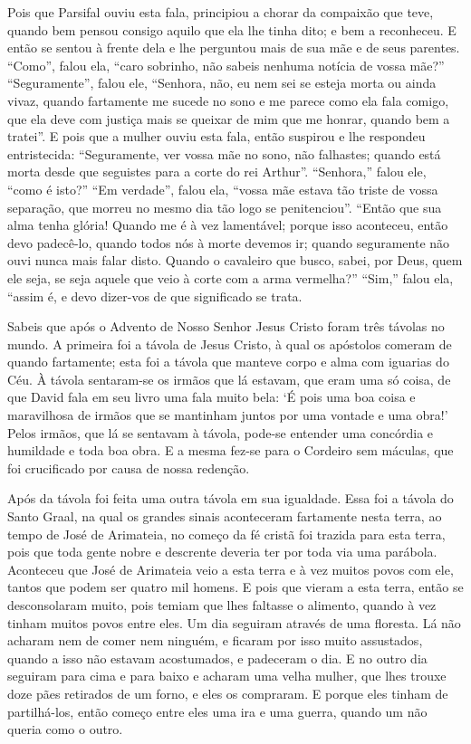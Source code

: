Pois que Parsifal ouviu esta fala, principiou a chorar da compaixão que
teve, quando bem pensou consigo aquilo que ela lhe tinha dito; e bem a
reconheceu. E então se sentou à frente dela e lhe perguntou mais de sua mãe e
de seus parentes. “Como”, falou ela, “caro sobrinho, não sabeis nenhuma notícia
de vossa mãe?” “Seguramente”, falou ele, “Senhora, não, eu nem sei se esteja
morta ou ainda vivaz, quando fartamente me sucede no sono e me parece como ela
fala comigo, que ela deve com justiça mais se queixar de mim que me honrar,
quando bem a tratei”. E pois que a mulher ouviu esta fala, então suspirou e lhe
respondeu entristecida: “Seguramente, ver vossa mãe no sono, não falhastes;
quando está morta desde que seguistes para a corte do rei Arthur”. “Senhora,”
falou ele, “como é isto?” “Em verdade”, falou ela, “vossa mãe estava tão
triste de vossa separação, que morreu no mesmo dia tão logo se penitenciou”.
“Então que sua alma tenha glória! Quando me é à vez lamentável; porque isso
aconteceu, então devo padecê-lo, quando todos nós à morte devemos ir; quando
seguramente não ouvi nunca mais falar disto. Quando o cavaleiro que busco,
sabei, por Deus, quem ele seja, se seja aquele que veio à corte com a arma
vermelha?” “Sim,” falou ela, “assim é, e devo dizer-vos de que significado se
trata.

Sabeis que após o Advento de Nosso Senhor Jesus Cristo foram três távolas no
mundo. A primeira foi a távola de Jesus Cristo, à qual os apóstolos comeram de
quando fartamente; esta foi a távola que manteve corpo e alma com iguarias do
Céu. À távola sentaram-se os irmãos que lá estavam, que eram uma só coisa, de
que David fala em seu livro uma fala muito bela: ‘É pois uma boa coisa e
maravilhosa de irmãos que se mantinham juntos por uma vontade e uma obra!’
Pelos irmãos, que lá se sentavam à távola, pode-se entender uma concórdia e
humildade e toda boa obra. E a mesma fez-se para o Cordeiro sem máculas, que
foi crucificado por causa de nossa redenção. 

Após da távola foi feita uma outra távola em sua igualdade. Essa foi a
távola do Santo Graal, na qual os grandes sinais aconteceram fartamente nesta
terra, ao tempo de José de Arimateia, no começo da fé cristã foi trazida para
esta terra, pois que toda gente nobre e descrente deveria ter por toda via uma
parábola. Aconteceu que José de Arimateia veio a esta terra e à vez muitos
povos com ele, tantos que podem ser quatro mil homens. E pois que vieram a esta
terra, então se desconsolaram muito, pois temiam que lhes faltasse o alimento,
quando à vez tinham muitos povos entre eles. Um dia seguiram através de uma
floresta. Lá não acharam nem de comer nem ninguém, e ficaram por isso muito
assustados, quando a isso não estavam acostumados, e padeceram o dia. E no
outro dia seguiram para cima e para baixo e acharam uma velha mulher, que lhes
trouxe doze pães retirados de um forno, e eles os compraram. E porque eles
tinham de partilhá-los,  então começo entre eles uma ira e uma guerra, quando
um não queria como o outro.

